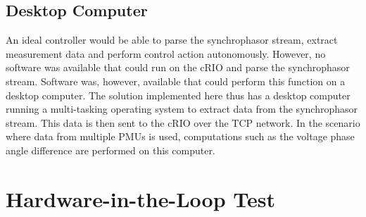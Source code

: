 \documentclass[conference]{IEEEtran}
\begin{document}
\subsection{Desktop Computer} An ideal controller would be able to parse the synchrophasor stream, extract measurement data and perform control action autonomously. However, no software was available that could run on the cRIO and parse the synchrophasor stream. Software \cite{SDK} was, however, available that could perform this function on a desktop computer. The solution implemented here thus has a desktop computer running a multi-tasking operating system to extract data from the synchrophasor stream. This data is then sent to the cRIO over the TCP network. In the scenario where data from multiple PMUs is used, computations such as the voltage phase angle difference are performed on this computer.

\section{Hardware-in-the-Loop Test} \label{HILtest}
\end{document}
